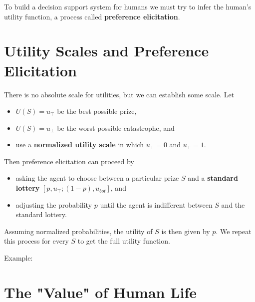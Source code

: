 \documentclass[11pt]{article}
\begin{document}
To build a decision support system for humans we must try to infer the human's utility function, a process called \textbf{preference elicitation}.
\section{Utility Scales and Preference Elicitation}
\label{sec:orgf0c2ae7}

There is no absolute scale for utilities, but we can establish some scale.  Let

\begin{itemize}
\item \(U(S) = u_{\top}\) be the best possible prize,
\item \(U(S) = u_{\bot}\) be the worst possible catastrophe, and
\item use a \textbf{normalized utility scale} in which \(u_{\bot} = 0\) and \(u_{\top} = 1\).
\end{itemize}

Then preference elicitation can proceed by

\begin{itemize}
\item asking the agent to choose between a particular prize \(S\) and a \textbf{standard lottery} \([p, u_{\top}; (1-p), u_{bot}]\), and
\item adjusting the probability \(p\) until the agent is indifferent between \(S\) and the standard lottery.
\end{itemize}

Assuming normalized probabilities, the utility of \(S\) is then given by \(p\).  We repeat this process for every \(S\) to get the full utility function.

Example:
\section{The "Value" of Human Life}
\label{sec:org0e9775a}
\end{document}
